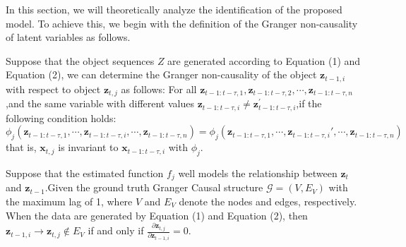 In this section, we will theoretically analyze the identification of the proposed model. To achieve this, we begin with the definition of the Granger non-causality of latent variables as follows. 
\begin{definition}
\label{def: Granger non-causality of Latent Variables}
      Suppose that the object sequences $Z$ are generated according to Equation (1) and Equation (2), we can determine the Granger non-causality of the object $\mathbf{z}_{t-1,i}$ with respect to object $\mathbf{z}_{t,j}$ as follows: For all $\mathbf{z}_{t-1:t-\tau,1},\mathbf{z}_{t-1:t-\tau,2},\cdots,\mathbf{z }_{t-1:t-\tau,n}$,and the same variable with different values $\mathbf{z}_{t-1:t-\tau,i} \neq \mathbf{z}^{'}_{t-1:t-\tau,i}$,if the following condition holds:
\begin{equation}
\phi_j(\mathbf{z}_{t - 1:t - \tau,1}, \cdots, \mathbf{z}_{t - 1:t - \tau,i}, \cdots, \mathbf{z}_{t - 1:t - \tau,n}) = \phi_j(\mathbf{z}_{t - 1:t - \tau,1}, \cdots, \mathbf{z}_{t - 1:t - \tau,i}', \cdots, \mathbf{z}_{t - 1:t - \tau,n})
\end{equation}
that is, $\mathbf{x}_{t,j}$ is invariant to $\mathbf{x}_{t-1:t-\tau,i}$ with $\phi_j$.
\end{definition}

\begin{prop}
    Suppose that the estimated function $f_j$ well models the relationship between $\mathbf{z}_{t}$ and $\mathbf{z}_{t-1}$.Given the ground truth Granger Causal structure $\mathcal{G}=(V, E_V)$ with the maximum lag of 1, where $V$ and $E_V$ denote the nodes and edges, respectively. When the data are generated by Equation (1) and Equation (2), then $\mathbf{z}_{t-1,i} \rightarrow \mathbf{z}_{t,j} \notin E_V$ if and only if $\frac{\partial \mathbf{z}_{t,j}}{\partial  \mathbf{z}_{t-1,i}}=0$.
\end{prop}

